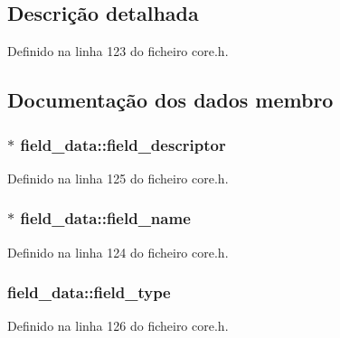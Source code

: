\subsection{Descrição detalhada}


Definido na linha 123 do ficheiro core.\-h.



\subsection{Documentação dos dados membro}
\hypertarget{structfield__data_a4611e29ce2251d6402952826983d17a1}{
\subsubsection[{field\-\_\-descriptor}]{$\ast$ field\-\_\-data\-::field\-\_\-descriptor}}\label{structfield__data_a4611e29ce2251d6402952826983d17a1}


Definido na linha 125 do ficheiro core.\-h.

\hypertarget{structfield__data_a54a2dc5570404dfd1130871d48e2a044}{
\subsubsection[{field\-\_\-name}]{$\ast$ field\-\_\-data\-::field\-\_\-name}}\label{structfield__data_a54a2dc5570404dfd1130871d48e2a044}


Definido na linha 124 do ficheiro core.\-h.

\hypertarget{structfield__data_a5cf199a1fe02916e0b0e4d27b8d3646f}{
\subsubsection[{field\-\_\-type}]{ field\-\_\-data\-::field\-\_\-type}}\label{structfield__data_a5cf199a1fe02916e0b0e4d27b8d3646f}


Definido na linha 126 do ficheiro core.\-h.

